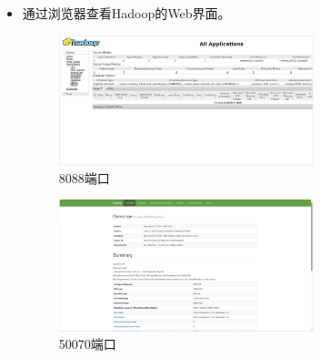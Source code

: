 \documentclass{article}
\begin{document}
\begin{itemize}
    \item 通过浏览器查看Hadoop的Web界面。
          \begin{figure}[H]
              \centering
              \includegraphics[width=0.7\textwidth]{./pic/11.jpg}
              \caption{8088端口}
          \end{figure}
          \begin{figure}[H]
              \centering
              \includegraphics[width=0.7\textwidth]{./pic/12.jpg}
              \caption{50070端口}
          \end{figure}
\end{itemize}
\end{document}
